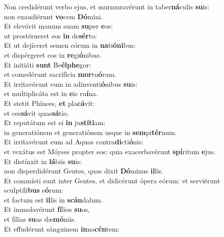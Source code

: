 \oddverse Non credidérunt verbo ejus, et murmuravérunt in taber\textbf{ná}culis \textbf{su}is:~\*\\
\oddverse non exaudiérunt \textbf{vo}cem \textbf{Dó}mini.\\
\evenverse Et elevávit manum suam \textbf{su}per \textbf{e}os:~\*\\
\evenverse ut prostérneret eos \textbf{in} de\textbf{sér}to:\\
\oddverse Et ut dejíceret semen eórum in \textbf{na}ti\textbf{ó}\textbf{ni}bus:~\*\\
\oddverse et dispérgeret eos in \textbf{re}gi\textbf{ó}nibus.\\
\evenverse Et initiáti \textbf{sunt} Be\textbf{él}\textbf{phe}gor:~\*\\
\evenverse et comedérunt sacrifícia \textbf{mor}tu\textbf{ó}rum.\\
\oddverse Et irritavérunt eum in adinventi\textbf{ó}nibus \textbf{su}is:~\*\\
\oddverse et multiplicáta est in \textbf{e}is ru\textbf{í}na.\\
\evenverse Et stetit Phínees, \textbf{et} pla\textbf{cá}vit:~\*\\
\evenverse et ces\textbf{sá}vit quas\textbf{sá}tio.\\
\oddverse Et reputátum est ei \textbf{in} ju\textbf{stí}\textbf{ti}am:~\*\\
\oddverse in generatiónem et generatiónem usque in \textbf{sem}pi\textbf{tér}num.\\
\evenverse Et irritavérunt eum ad Aquas contra\textbf{di}cti\textbf{ó}nis:~\*\\
\evenverse et vexátus est Móyses propter eos: quia exacerbavérunt \textbf{spí}ritum \textbf{e}jus.\\
\oddverse Et distínxit in \textbf{lá}biis \textbf{su}is:~\*\\
\oddverse non disperdidérunt Gentes, quas dixit \textbf{Dó}minus \textbf{il}lis.\\
\evenverse Et commísti sunt inter Gentes, et didicérunt ópera eórum: et serviérunt sculptíli\textbf{bus} e\textbf{ó}rum:~\*\\
\evenverse et factum est \textbf{il}lis in \textbf{scán}dalum.\\
\oddverse Et immolavérunt \textbf{fí}lios \textbf{su}os,~\*\\
\oddverse et fílias \textbf{su}as dæ\textbf{mó}niis.\\
\evenverse Et effudérunt sánguinem \textbf{in}no\textbf{cén}tem:~\*\\
